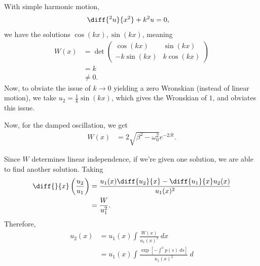 \documentclass[10pt]{mypackage}
\begin{document}
  \begin{example}
    With simple harmonic motion,
    \begin{align*}
      \diff{^2u}{x^2} + k^2u &= 0,
    \end{align*}
    we have the solutions $\cos\left( kx \right),\sin\left( kx \right)$, meaning
    \begin{align*}
      W(x) &= \det \begin{pmatrix}\cos\left( kx \right) & \sin\left( kx \right)\\ -k\sin\left( kx \right) & k\cos\left( kx \right)\end{pmatrix}\\
           &= k\\
           &\neq 0.
    \end{align*}
    Now, to obviate the issue of $k\rightarrow 0$ yielding a zero Wronskian (instead of linear motion), we take $u_2 = \frac{1}{k}\sin\left( kx \right)$, which gives the Wronskian of $1$, and obviates this issue.\newline

    Now, for the damped oscillation, we get
    \begin{align*}
      W(x) &= 2\sqrt{\beta^2 - \omega_0^2} e^{-2\beta t}.
    \end{align*}
  \end{example}
  Since $W$ determines linear independence, if we're given one solution, we are able to find another solution. Taking
  \begin{align*}
    \diff{}{x}\left( \frac{u_2}{u_1} \right) &= \frac{u_1(x) \diff{u_2}{x} - \diff{u_1}{x}u_2(x)}{u_1(x)^2}\\
                                             &=\frac{W}{u_1^2}.
  \end{align*}
  Therefore,
  \begin{align*}
    u_2(x) &= u_1(x) \int_{}^{} \frac{W(x)}{u_1(x)^2}\:dx\\
           &= u_1(x) \int_{}^{} \frac{\exp\left[ - \int_{}^{x} p(s)\:ds \right]}{u_1(x)^2}\:d
  \end{align*}
\end{document}
